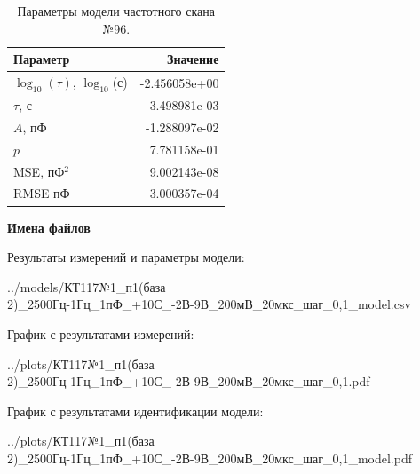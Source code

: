 \begin{table}[!ht]
    \centering
    \caption{Параметры модели частотного скана №96.}
    \begin{tabular}{|l|r|}
        \hline
        Параметр                                       & Значение                  \\ \hline
        $\log_{10}(\tau)$, $\log_{10}$(с)              & -2.456058e+00             \\ \hline
        $\tau$, с                                      & 3.498981e-03              \\ \hline
        $A$, пФ                                        & -1.288097e-02             \\ \hline
        $p$                                            & 7.781158e-01              \\ \hline
        MSE, пФ$^2$                                    & 9.002143e-08              \\ \hline
        RMSE пФ                                        & 3.000357e-04              \\ \hline
    \end{tabular}
    \label{table:frequency_scan_model_96}
\end{table}

\textbf{Имена файлов}

Результаты измерений и параметры модели:

\scriptsize../models/КТ117№1\_п1(база 2)\_2500Гц-1Гц\_1пФ\_+10С\_-2В-9В\_200мВ\_20мкс\_шаг\_0,1\_model.csv
\normalsize

График с результатами измерений:

\scriptsize../plots/КТ117№1\_п1(база 2)\_2500Гц-1Гц\_1пФ\_+10С\_-2В-9В\_200мВ\_20мкс\_шаг\_0,1.pdf
\normalsize

График с результатами идентификации модели:

\scriptsize../plots/КТ117№1\_п1(база 2)\_2500Гц-1Гц\_1пФ\_+10С\_-2В-9В\_200мВ\_20мкс\_шаг\_0,1\_model.pdf
\normalsize

